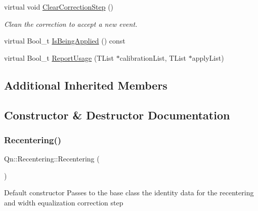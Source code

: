 \begin{DoxyCompactItemize}
\item 
\mbox{\label{classQn_1_1Recentering_a692ae2cc6740be54d0b1591a3db62d39}} 
virtual void \mbox{\hyperlink{classQn_1_1Recentering_a692ae2cc6740be54d0b1591a3db62d39}{Clear\+Correction\+Step}} ()
\begin{DoxyCompactList}\small\item\em Clean the correction to accept a new event. \end{DoxyCompactList}\item 
virtual Bool\+\_\+t \mbox{\hyperlink{classQn_1_1Recentering_a3849efa27b2827a2f307a100bc046916}{Is\+Being\+Applied}} () const
\item 
virtual Bool\+\_\+t \mbox{\hyperlink{classQn_1_1Recentering_a06240f91a7656df95ac5aa55773b056a}{Report\+Usage}} (T\+List $\ast$calibration\+List, T\+List $\ast$apply\+List)
\end{DoxyCompactItemize}
\subsection*{Additional Inherited Members}


\subsection{Constructor \& Destructor Documentation}
\mbox{\label{classQn_1_1Recentering_a6829d3d68b7eb2be8d2ae7e3f5b5e7a8}} 
\subsubsection{\texorpdfstring{Recentering()}{Recentering()}}
{\footnotesize\ttfamily Qn\+::\+Recentering\+::\+Recentering (\begin{DoxyParamCaption}{ }\end{DoxyParamCaption})}

Default constructor Passes to the base class the identity data for the recentering and width equalization correction step \mbox{\label{classQn_1_1Recentering_aa8615dd4cbcbc96f31b6db194b976e34}} 
